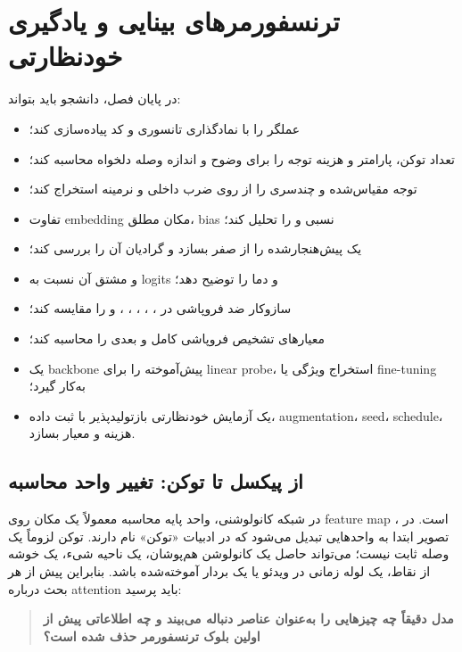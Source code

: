 \documentclass[12pt,openany,oneside]{book}
\begin{document}
\chapter{ترنسفورمرهای بینایی و یادگیری خودنظارتی}

\begin{learningbox}
در پایان فصل، دانشجو باید بتواند:
\begin{itemize}
\item عملگر  را با نمادگذاری تانسوری و کد پیاده‌سازی کند؛
\item تعداد توکن، پارامتر و هزینه توجه را برای وضوح و اندازه وصله دلخواه محاسبه کند؛
\item توجه مقیاس‌شده و چندسری را از روی ضرب داخلی و نرمینه استخراج کند؛
\item تفاوت embedding مکان مطلق، bias نسبی و  را تحلیل کند؛
\item یک  پیش‌هنجارشده را از صفر بسازد و گرادیان آن را بررسی کند؛
\item {} و مشتق آن نسبت به logits و دما را توضیح دهد؛
\item سازوکار ضد فروپاشی در ، ، ، ، ،  و  را مقایسه کند؛
\item معیارهای تشخیص فروپاشی کامل و بعدی را محاسبه کند؛
\item یک backbone پیش‌آموخته را برای linear probe، استخراج ویژگی یا fine-tuning به‌کار گیرد؛
\item یک آزمایش خودنظارتی بازتولیدپذیر با ثبت داده، augmentation، seed، schedule، هزینه و معیار بسازد.
\end{itemize}
\end{learningbox}

\section{از پیکسل تا توکن: تغییر واحد محاسبه}
در شبکه کانولوشنی، واحد پایه محاسبه معمولاً یک مکان روی feature map است. در ، تصویر ابتدا به واحدهایی تبدیل می‌شود که
در ادبیات «توکن» نام دارند. توکن لزوماً یک وصله ثابت نیست؛ می‌تواند حاصل یک کانولوشن هم‌پوشان، یک ناحیه شیء، یک خوشه از نقاط،
یک لوله زمانی در ویدئو یا یک بردار آموخته‌شده باشد. بنابراین پیش از هر بحث درباره attention باید پرسید:
\begin{quote}
\textbf{مدل دقیقاً چه چیزهایی را به‌عنوان عناصر دنباله می‌بیند و چه اطلاعاتی پیش از اولین بلوک ترنسفورمر حذف شده است؟}
\end{quote}
\end{document}
